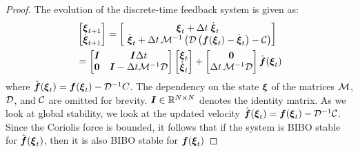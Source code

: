 \begin{proof}
The evolution of the discrete-time feedback system is given as:
\begin{equation}
	\begin{split}
	& \begin{bmatrix}
	 \vecs \xi_{t+1} \\ \dot{\vecs \xi}_{t+1}
	\end{bmatrix}
	=
	\begin{bmatrix}
		\vect \xi_t + \Delta t  \; \dot{\vect \xi}_t \\ \
		\dot{\vecs \xi}_t + \Delta t \, \matd{M}^{-1} \left( \matd{D} \left( \vect f(\vecs \xi_t) - \dot{\vecs \xi}_t \right) - \matd{C} \right)
	\end{bmatrix} \\
	&  = %
	\begin{bmatrix}
		\matr{I} & \matr{I} \Delta t \\
		\vect{0} & \matr{I} - \Delta t \matd{M}^{-1} \matd D 
	\end{bmatrix}
	\begin{bmatrix}
		\vect \xi_t \\ \dot{\vect \xi}_t
	\end{bmatrix}
	+ \begin{bmatrix}
		\vect{0} \\ 
		\Delta t \, \matd{M}^{-1} \matd{D} 
	\end{bmatrix}
	\hat{\vect f}(\vecs \xi_t) 
	\label{eq:discrete_time_proof}
	\end{split}
\end{equation}
where $\hat{\boldsymbol{f}}(\boldsymbol{\xi}_t) = \boldsymbol{f}(\boldsymbol{\xi}_t) - \mathcal{D}^{-1} C$.  The dependency on the state $\boldsymbol{\xi}$ of the matrices $\mathcal{M}$, $\mathcal{D}$, and $\mathcal{C}$ are omitted for brevity. $\boldsymbol{I} \in \mathbb{R}^{N \times N}$ denotes the identity matrix.
As we look at global stability, we look at the updated velocity $\hat{\boldsymbol{f}}(\boldsymbol{\xi}_t) = \boldsymbol{f}(\boldsymbol{\xi}_t) - \mathcal{D}^{-1} \mathcal{C}$. Since the Coriolis force is bounded, it follows that if the system is BIBO stable for $\hat{\boldsymbol{f}}(\boldsymbol{\xi}_t)$, then it is also BIBO stable for $\boldsymbol{f}(\boldsymbol{\xi}_t)$ 


\end{proof}
